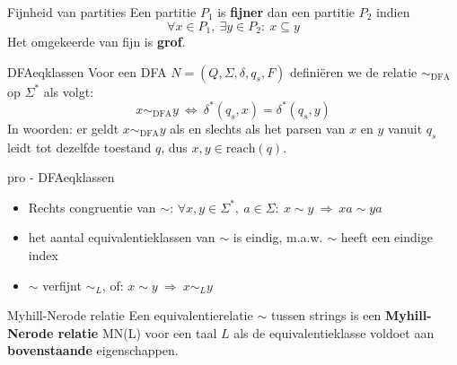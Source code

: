 \vspace{0.5cm}

\begin{theo}{Fijnheid van partities}
    Een partitie $P_1$ is \textbf{fijner} dan een partitie $P_2$ indien
    \begin{equation*}
        \forall x \in P_1,\ \exists y \in P_2: \ x \subseteq y
    \end{equation*}
    Het omgekeerde van fijn is \textbf{grof}.
\end{theo}

\begin{theo}{DFAeqklassen}
    Voor een DFA $N = (Q, \Sigma, \delta, q_s, F)$ definiëren we de relatie $\sim_{\text{DFA}}$ op $\Sigma^*$ als volgt:
    \begin{equation*}
        x \sim_{\text{DFA}} y \ \Leftrightarrow \ \delta^*(q_s,x) = \delta^*(q_s,y)
    \end{equation*}
    In woorden: er geldt $x \sim_{\text{DFA}} y$ als en slechts als het parsen van $x$ en $y$ vanuit $q_s$ leidt tot dezelfde toestand $q$, dus $x,y \in \text{reach}(q)$.
\end{theo}

\begin{pro}{pro - DFAeqklassen}
    \begin{itemize}
        \item Rechts congruentie van $\sim$: $\forall x,y \in \Sigma^*, \ a \in \Sigma: \ x \sim y \ \Rightarrow \ xa \sim ya $
        \item het aantal equivalentieklassen van $\sim$ is eindig, m$.$a$.$w$.$ $\sim$ heeft een eindige index
        \item $\sim$ verfijnt $\sim_L$, of: $x \sim y \ \Rightarrow \ x \sim_L y$
    \end{itemize}
\end{pro}

\begin{theo}{Myhill-Nerode relatie}
    Een equivalentierelatie $\sim$ tussen strings is een \textbf{Myhill-Nerode relatie} MN(L) voor een taal $L$ als de equivalentieklasse
    voldoet aan \textbf{bovenstaande} eigenschappen.
\end{theo}

